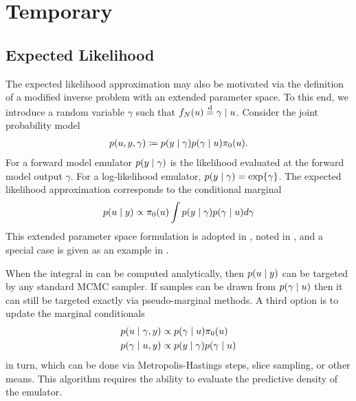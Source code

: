 \documentclass[12pt]{article}
\begin{document}
\section{Temporary}
\subsection{Expected Likelihood}
The expected likelihood approximation may also be motivated via the definition of a modified 
inverse problem with an extended parameter space. To this end, we introduce a random variable
$\gamma$ such that $\targetEm[\Ndesign](\Par) \overset{\mathrm{d}}{=} \gamma \given \Par$.
Consider the joint probability model 
\begin{align}
p(\Par, \obs, \gamma) \Def 
p(\obs \given \gamma) p(\gamma \given \Par) \priorDens(\Par). \label{eq:EL-prob-model}
\end{align}
For a forward model emulator $p(\obs \given \gamma)$ is the likelihood evaluated at
the forward model output $\gamma$. For a log-likelihood emulator, 
$p(\obs \given \gamma) = \Exp{\gamma}$. The expected likelihood approximation 
corresponds to the conditional marginal 
\begin{align}
p(\Par \given \obs) \propto \priorDens(\Par) \int p(\obs \given \gamma) p(\gamma \given \Par) d\gamma
\label{eq:EL-marginal}
\end{align}
This extended parameter space formulation is adopted in \citet{BilionisBayesSurrogates}, noted in
\citet{SinsbeckNowak}, and a special case is given as an example in \citet{StuartTeck2}.

When the integral in  can be computed analytically, then $p(\Par \given \obs)$ can 
be targeted by any standard MCMC sampler. If samples can be drawn from $p(\gamma \given \Par)$ then
it can still be targeted exactly via pseudo-marginal methods. A third option is to update the marginal conditionals
\begin{align}
p(\Par \given \gamma, \obs) &\propto p(\gamma \given \Par) \priorDens(\Par) \label{eq:EL-conditionals} \\
p(\gamma \given \Par, \obs) &\propto p(\obs \given \gamma) p(\gamma \given \Par)
\end{align}
in turn, which can be done via Metropolis-Hastings steps, slice sampling, or other means. This algorithm
requires the ability to evaluate the predictive density of the emulator.
\end{document}

